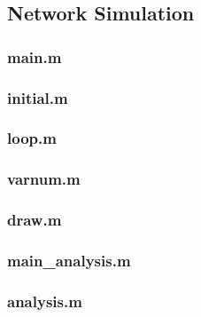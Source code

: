 \documentclass[11pt]{scrartcl}
\begin{document}
\subsection{Network Simulation}
\label{sec:network_simulation}

\subsubsection{main.m}



\null
\null

\subsubsection{initial.m}



\null
\null

\subsubsection{loop.m}



\null
\null

\subsubsection{varnum.m}



\null
\null

\subsubsection{draw.m}



\null
\null

\newpage
\subsubsection{main\_analysis.m}



\null
\null

\subsubsection{analysis.m}
\end{document}
